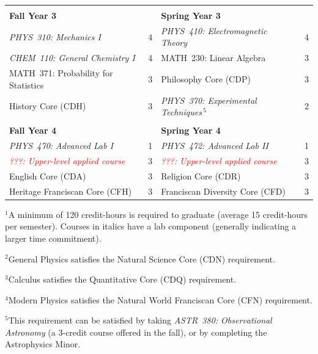 \documentclass[12pt]{article}
\begin{document}
\begin{table}[h!]
\begin{center}
{\begin{tabular*}{0.9\textwidth}{@{\extracolsep{\fill}}lclc}
 & \\
{\Large \textbf{Fall Year 3}} & & {\Large \textbf{Spring Year 3}} & \\
\hline
{\em PHYS~310: Mechanics I}         & 4 & {\em PHYS~410: Electromagnetic Theory}  & 4 \\
{\em CHEM~110: General Chemistry I} & 4 & MATH~230: Linear Algebra    & 3 \\
MATH~371: Probability for Statistics   & 3 & Philosophy Core (CDP)             & 3 \\
History Core (CDH)                  & 3 & {\em PHYS~370: Experimental Techniques}\,$^{5}$ & 2 \\
 & \\
{\Large \textbf{Fall Year 4}} & & {\Large \textbf{Spring Year 4}} & \\
\hline
{\em PHYS~470: Advanced Lab I} & 1 & {\em PHYS~472: Advanced Lab II}  & 1 \\
{\em \textcolor{red}{???: Upper-level applied course}} & 3 & {\em \textcolor{red}{???: Upper-level applied course}} & 3 \\
English Core (CDA)                         & 3 & Religion Core (CDR)               & 3 \\
Heritage Franciscan Core (CFH)             & 3 &  Franciscan Diversity Core (CFD)  & 3 \\
\end{tabular*}
}
\end{center}
\end{table}

\vspace*{-4mm}
\hspace{0.1in}$^{1}$A minimum of 120 credit-hours is required to
graduate (average 15 credit-hours per semester).  \hspace*{0.42in}Courses in italics have a lab
component (generally indicating a larger time commitment). 

\hspace{0.1in}$^{2}$General Physics satisfies the Natural Science Core (CDN) requirement.

\hspace{0.1in}$^{3}$Calculus satisfies the Quantitative Core (CDQ) requirement.

\hspace{0.1in}$^{4}$Modern Physics satisfies the Natural World Franciscan Core
(CFN) requirement.

\hspace{0.1in}$^{5}$This requirement can be satisfied by taking {\em ASTR~380:
  Observational Astronomy} (a 3-credit \hspace*{0.42in}course offered in the
fall), or by completing the Astrophysics Minor.
\end{document}
